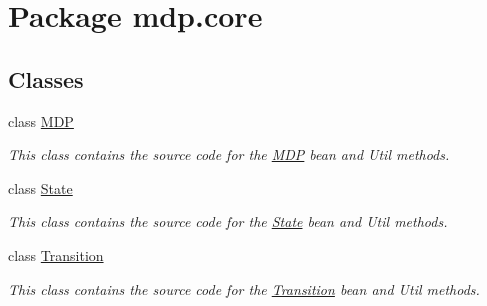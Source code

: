 \hypertarget{namespacemdp_1_1core}{}\section{Package mdp.\+core}
\label{namespacemdp_1_1core}
\subsection*{Classes}
\begin{DoxyCompactItemize}
\item 
class \hyperlink{classmdp_1_1core_1_1_m_d_p}{M\+D\+P}
\begin{DoxyCompactList}\small\item\em This class contains the source code for the \hyperlink{classmdp_1_1core_1_1_m_d_p}{M\+D\+P} bean and Util methods. \end{DoxyCompactList}\item 
class \hyperlink{classmdp_1_1core_1_1_state}{State}
\begin{DoxyCompactList}\small\item\em This class contains the source code for the \hyperlink{classmdp_1_1core_1_1_state}{State} bean and Util methods. \end{DoxyCompactList}\item 
class \hyperlink{classmdp_1_1core_1_1_transition}{Transition}
\begin{DoxyCompactList}\small\item\em This class contains the source code for the \hyperlink{classmdp_1_1core_1_1_transition}{Transition} bean and Util methods. \end{DoxyCompactList}\end{DoxyCompactItemize}
